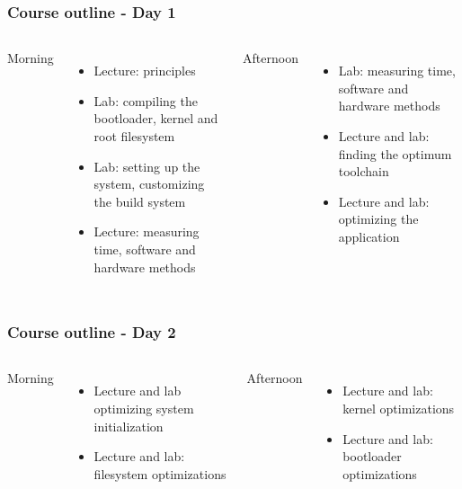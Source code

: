 \begin{frame}
\frametitle{Course outline - Day 1}
\begin{columns}
Morning
  \begin{itemize}
    \item Lecture: principles
    \item Lab: compiling the bootloader, kernel and root filesystem
    \item Lab: setting up the system, customizing the build system
    \item Lecture: measuring time, software and hardware methods
\end{itemize}
  Afternoon
  \begin{itemize}
    \item Lab: measuring time, software and hardware methods
    \item Lecture and lab: finding the optimum toolchain
    \item Lecture and lab: optimizing the application
  \end{itemize}
\end{columns}
\end{frame}

\begin{frame}
\frametitle{Course outline - Day 2}
\begin{columns}
Morning
  \begin{itemize}
    \item Lecture and lab optimizing system initialization
    \item Lecture and lab: filesystem optimizations
\end{itemize}
  Afternoon
  \begin{itemize}
    \item Lecture and lab: kernel optimizations
    \item Lecture and lab: bootloader optimizations
  \end{itemize}
\end{columns}
\end{frame}

